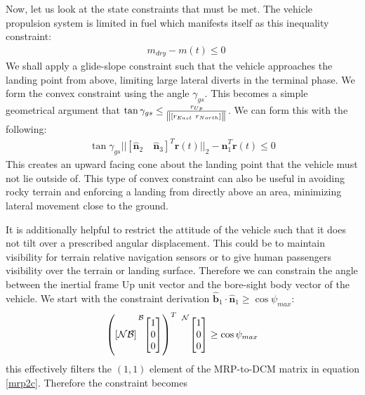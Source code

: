 Now, let us look at the state constraints that must be met. The vehicle propulsion system is limited in fuel which manifests itself as this inequality constraint:
\begin{align}
& m_{dry} - m(t) \leq 0
\end{align}
%
We shall apply a glide-slope constraint such that the vehicle approaches the landing point from above, limiting large lateral diverts in the terminal phase. We form the convex constraint using the angle $\gamma_{gs}$. This becomes a simple geometrical argument that $\tan{\gamma_{gs}} \leq \frac{r_{Up}}{\norm{[ r_{East} \ r_{North}]}}$. We can form this with the following:
\begin{align}
\tan{\gamma_{gs}} || [\hat{\bm{n}}_2 \quad \hat{\bm{n}}_3 ]^T \mathbf{r}(t) \lvert\lvert_2 - \hat{\bm{n}}_1^T \mathbf{r}(t) \leq 0
\end{align}
This  creates an upward facing cone about the landing point that the vehicle must not lie outside of. This type of convex constraint can also be useful in avoiding rocky terrain and enforcing a landing from directly above an area, minimizing lateral movement close to the ground.


It is additionally helpful to restrict the attitude of the vehicle such that it does not tilt over a prescribed angular displacement. This could be to maintain visibility for terrain relative navigation sensors or to give human passengers visibility over the terrain or landing surface. Therefore we can constrain the angle between the inertial frame Up unit vector and the bore-sight body vector of the vehicle. We start with the constraint derivation $\hat{\bm{b}}_1 \cdot \hat{\bm{n}}_1 \geq \cos{\psi_{max}}$:
\begin{align}
	\left (
	[\mathcal{NB}]
	\prescript{\mathcal{B}}{}{
	\begin{bmatrix}
		1 \\ 0 \\ 0
	\end{bmatrix}}
	\right )^T \
	\prescript{\mathcal{N}}{}{
	\begin{bmatrix}
		1 \\  0 \\ 0
	\end{bmatrix}}
	\geq \cos{\psi_{max}}
\end{align}
this effectively filters the $(1,1)$ element of the MRP-to-DCM matrix in equation \ref{mrp2c}. Therefore the constraint becomes

